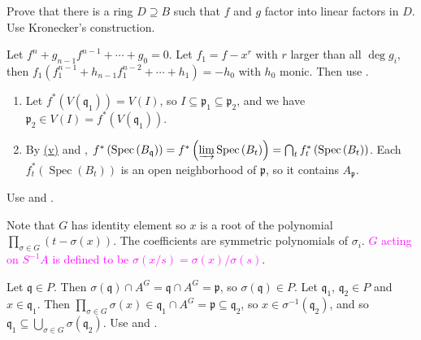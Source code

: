 \begin{exercise}\label{ex5.8}
	Prove that there is a ring $D\supseteq B$ such that $f$ and $g$ factor into linear factors in $D$. Use Kronecker's construction.
\end{exercise}

\begin{exercise}\label{ex5.9}
	Let $f^n+g_{n-1}f^{n-1}+\cdots+g_0=0$. Let $f_1=f-x^r$ with $r$ larger than all $\operatorname{deg}g_i$, then $f_1\left(f_1^{n-1}+h_{n-1}f_1^{n-2}+\cdots+h_1\right)=-h_0$ with $h_0$ monic. Then use .
\end{exercise}

\begin{exercise}\label{ex5.10}
	\begin{enumerate}
		\item[(a) $\Rightarrow$ (b)] Let $f^*(V(\mathfrak{q}_1))=V(I)$, so $I\subseteq\mathfrak{p}_1\subseteq\mathfrak{p}_2$, and we have $\mathfrak{p}_2\in V(I)=f^*(V(\mathfrak{q}_1))$.
		\item[(a') $\Rightarrow$ (c')] By \hyperref[ex3.23]{(v)} and , $f^*\left(\operatorname{Spec}\left(B_\mathfrak{q}\right)\right)=f^*\left(\varinjlim\operatorname{Spec}\left(B_t\right)\right)=\bigcap_tf_t^*\left(\operatorname{Spec}\left(B_t\right)\right)$. Each $f_t^*\left(\operatorname{Spec}\left(B_t\right)\right)$ is an open neighborhood of $\mathfrak{p}$, so it contains $A_\mathfrak{p}$.
	\end{enumerate}
\end{exercise}

\begin{exercise}\label{ex5.11}
	Use  and .
\end{exercise}

\begin{exercise}\label{ex5.12}
	Note that $G$ has identity element so $x$ is a root of the polynomial $\prod_{\sigma\in G}\left(t-\sigma(x)\right)$. The coefficients are symmetric polynomials of $\sigma_i$. \textcolor{magenta}{$G$ acting on $S^{-1}A$ is defined to be $\sigma(x/s)=\sigma(x)/\sigma(s)$}.
\end{exercise}

\begin{exercise}\label{ex5.13}
	Let $\mathfrak{q}\in P$. Then $\sigma(\mathfrak{q})\cap A^G=\mathfrak{q}\cap A^G=\mathfrak{p}$, so $\sigma(\mathfrak{q})\in P$. Let $\mathfrak{q}_1$, $\mathfrak{q}_2\in P$ and $x\in\mathfrak{q}_1$. Then $\prod_{\sigma\in G}\sigma(x)\in\mathfrak{q}_1\cap A^G=\mathfrak{p}\subseteq\mathfrak{q}_2$, so $x\in\sigma^{-1}\left(\mathfrak{q}_2\right)$, and so $\mathfrak{q}_1\subseteq\bigcup_{\sigma\in G}\sigma\left(\mathfrak{q}_2\right)$. Use  and .
\end{exercise}

